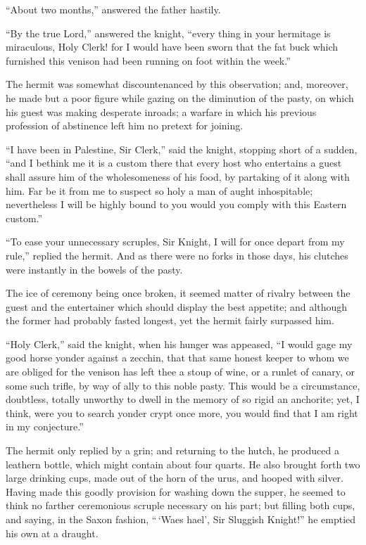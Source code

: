 ``About two months,'' answered the father hastily.

``By the true Lord,'' answered the knight, ``every thing in your
hermitage is miraculous, Holy Clerk! for I would have been sworn that
the fat buck which furnished this venison had been running on foot
within the week.''

The hermit was somewhat discountenanced by this observation; and,
moreover, he made but a poor figure while gazing on the diminution of
the pasty, on which his guest was making desperate inroads; a warfare in
which his previous profession of abstinence left him no pretext for
joining.

``I have been in Palestine, Sir Clerk,'' said the knight, stopping short
of a sudden, ``and I bethink me it is a custom there that every host who
entertains a guest shall assure him of the wholesomeness of his food, by
partaking of it along with him. Far be it from me to suspect so holy a
man of aught inhospitable; nevertheless I will be highly bound to you
would you comply with this Eastern custom.''

``To ease your unnecessary scruples, Sir Knight, I will for once depart
from my rule,'' replied the hermit. And as there were no forks in those
days, his clutches were instantly in the bowels of the pasty.

The ice of ceremony being once broken, it seemed matter of rivalry
between the guest and the entertainer which should display the best
appetite; and although the former had probably fasted longest, yet the
hermit fairly surpassed him.

``Holy Clerk,'' said the knight, when his hunger was appeased, ``I would
gage my good horse yonder against a zecchin, that that same honest
keeper to whom we are obliged for the venison has left thee a stoup of
wine, or a runlet of canary, or some such trifle, by way of ally to this
noble pasty. This would be a circumstance, doubtless, totally unworthy
to dwell in the memory of so rigid an anchorite; yet, I think, were you
to search yonder crypt once more, you would find that I am right in my
conjecture.''

The hermit only replied by a grin; and returning to the hutch, he
produced a leathern bottle, which might contain about four quarts. He
also brought forth two large drinking cups, made out of the horn of the
urus, and hooped with silver. Having made this goodly provision for
washing down the supper, he seemed to think no farther ceremonious
scruple necessary on his part; but filling both cups, and saying, in the
Saxon fashion, ``\,`Waes hael', Sir Sluggish Knight!'' he emptied his
own at a draught.

